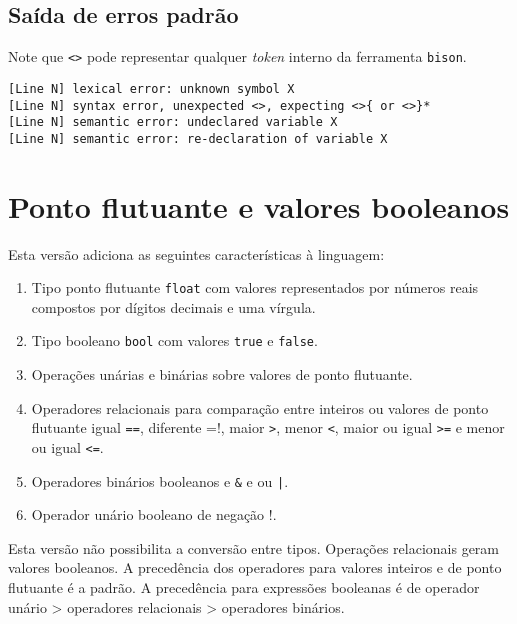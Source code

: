 \documentclass{sftex/sftex}
\newenvironment{smallenum}{
    \vspace{-1mm}
    \begin{enumerate}[label=\roman*.]
    \setlength{\parskip}{0pt}
    \setlength{\itemsep}{2pt}
}{
    \vspace{-2mm}
    \end{enumerate}
}
\begin{document}
\subsection{Saída de erros padrão}

Note que \verb!<>! pode representar qualquer \emph{token} interno da
ferramenta \verb!bison!.

\begin{verbatim}
[Line N] lexical error: unknown symbol X
[Line N] syntax error, unexpected <>, expecting <>{ or <>}*
[Line N] semantic error: undeclared variable X
[Line N] semantic error: re-declaration of variable X
\end{verbatim}

\section{Ponto flutuante e valores booleanos}

Esta versão adiciona as seguintes características à linguagem:

\begin{smallenum}

\item Tipo ponto flutuante \verb!float! com valores representados por
    números reais compostos por dígitos decimais e uma vírgula.

\item Tipo booleano \verb!bool! com valores \verb!true! e
    \verb!false!.

\item Operações unárias e binárias sobre valores de ponto flutuante.

\item Operadores relacionais para comparação entre inteiros ou valores de
    ponto flutuante igual \verb!==!, diferente \verb!!=!,
    maior \verb!>!, menor \verb!<!, maior ou igual \verb!>=! e
    menor ou igual \verb!<=!.

\item Operadores binários booleanos e \verb!&! e ou \verb!|!.

\item Operador unário booleano de negação \verb!!!.

\end{smallenum}

Esta versão não possibilita a conversão entre tipos. Operações relacionais
geram valores booleanos. A precedência dos operadores para valores inteiros e
de ponto flutuante é a padrão. A precedência para expressões booleanas é de
operador unário > operadores relacionais > operadores binários.
\end{document}
